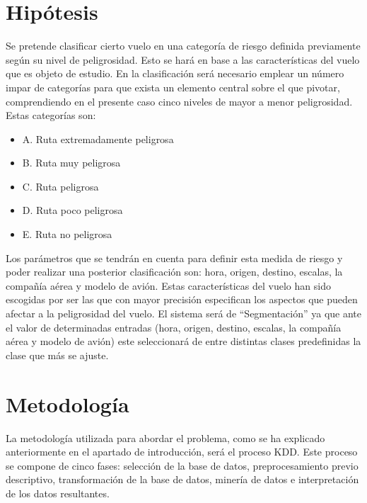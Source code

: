 \documentclass[a4paper,10pt]{article}
\begin{document}
\section{Hip\'otesis}
Se pretende clasificar cierto vuelo en una categor\'ia de riesgo definida previamente seg\'un su nivel de peligrosidad. Esto se har\'a en base a las caracter\'isticas del vuelo que es objeto de estudio.
\singlespacing
En la clasificaci\'on ser\'a necesario emplear un n\'umero impar de categor\'ias para que exista un elemento central sobre el que pivotar, comprendiendo en el presente caso cinco niveles de mayor a menor peligrosidad. Estas categor\'ias son:
\begin{itemize}
\item A. Ruta extremadamente peligrosa
\item B. Ruta muy peligrosa
\item C. Ruta peligrosa
\item D. Ruta poco peligrosa
\item E. Ruta no peligrosa
\end{itemize}

\pagebreak
	Los par\'ametros que se tendr\'an en cuenta para definir esta medida de riesgo y poder realizar una posterior clasificaci\'on son: hora, origen, destino, escalas, la compa\~n\'ia a\'erea y modelo de avi\'on.
    \singlespacing
	Estas caracter\'isticas del vuelo han sido escogidas por ser las que con mayor precisi\'on especifican los aspectos que pueden afectar a la peligrosidad del vuelo.
    \singlespacing
	El sistema ser\'a de ``Segmentaci\'on'' ya que ante el valor de determinadas entradas (hora, origen, destino, escalas, la compa\~n\'ia a\'erea y modelo de avi\'on) este seleccionar\'a de entre distintas clases predefinidas la clase que m\'as se ajuste.

\section{Metodolog\'ia}
La metodolog\'ia utilizada para abordar el problema, como se ha explicado anteriormente en el apartado de introducci\'on, ser\'a el proceso KDD. Este proceso se compone de cinco fases: selecci\'on de la base de datos, preprocesamiento previo descriptivo, transformaci\'on de la base de datos, miner\'ia de datos e interpretaci\'on de los datos resultantes.
\end{document}
